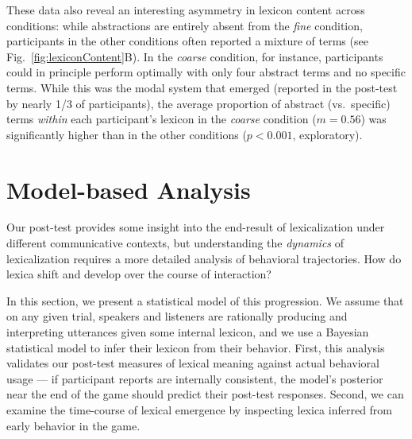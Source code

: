 These data also reveal an interesting asymmetry in lexicon content across conditions: while abstractions are entirely absent from the \emph{fine} condition, participants in the other conditions often reported a mixture of terms (see Fig.\ \ref{fig:lexiconContent}B). In the \emph{coarse} condition, for instance, participants could in principle perform optimally with only four abstract terms and no specific terms. While this was the modal system that emerged (reported in the post-test by nearly 1/3 of participants), the average proportion of abstract (vs.\ specific) terms \emph{within} each participant's lexicon in the \emph{coarse} condition ($m = 0.56$) was significantly higher than in the other conditions ($p < 0.001$, exploratory).

\section{Model-based Analysis}

Our post-test provides some insight into the end-result of lexicalization under different communicative contexts, but understanding the \emph{dynamics} of lexicalization requires a more detailed analysis of behavioral trajectories. How do lexica shift and develop over the course of interaction? 

In this section, we present a statistical model of this progression. We assume that on any given trial, speakers and listeners are rationally producing and interpreting utterances given some internal lexicon, and we use a Bayesian statistical model to infer their lexicon from their behavior. First, this analysis validates our post-test measures of lexical meaning against actual behavioral usage --- if participant reports are internally consistent, the model's posterior near the end of the game should predict their post-test responses. Second, we can examine the time-course of lexical emergence by inspecting lexica inferred from early behavior in the game. %


